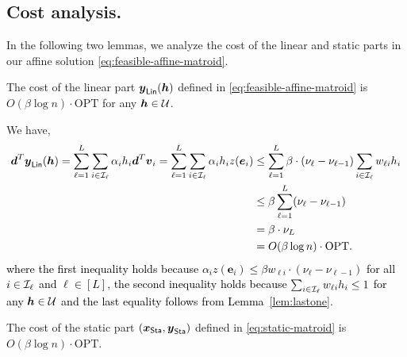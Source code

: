 \documentclass[moor]{informs1}              %
\newcommand{\opt}{\mathrm{OPT}}
\newcommand{\mb}[1]{\ensuremath{\boldsymbol{#1}}}
\newcommand*{\red}{\textcolor{black}}
\begin{document}
\subsection{Cost analysis.}
In the following two lemmas, we analyze the cost of the linear and static parts in our affine solution \eqref{eq:feasible-affine-matroid}.
\begin{lemma} \label{lem:cost-linear-matroid}
The cost of the linear part $\mb y_{\sf Lin}(\mb h)$ defined in \eqref{eq:feasible-affine-matroid} is $ O(\beta \log n)  \cdot \opt $ for any $\mb h \in {\cal U}$.
\end{lemma}
We have, 
\red{
\begin{align*}
\mb d ^T\mb y_{\sf Lin}( \mb h )   =  \sum_{\ell=1}^L \sum_{i \in  {\cal I}_{\ell}} \alpha_i h_i \mb d^T {\mb v}_i =   \sum_{\ell=1}^L \sum_{i \in  {\cal I}_{\ell}} \alpha_i h_i z( \mb e_i)
& \leq    \sum_{\ell=1}^L  \beta \cdot ( {\nu}_{\ell}-   {\nu}_{\ell-1})         \sum_{i \in  {\cal I}_{\ell}}   w_{\ell i}h_i \\
& \leq   \beta  \sum_{\ell=1}^L  ( {\nu}_{\ell}-   {\nu}_{\ell-1})       \\
& =  \beta \cdot {\nu}_L  \\
& =  O(\beta \log n)  \cdot \opt.
\end{align*}
where the first inequality holds because $\alpha_i z(\mb e_i)  \leq \beta w_{\ell i} \cdot( {\nu}_{\ell}-   {\nu}_{\ell-1})  $ for all $i \in {\cal I}_{\ell}$ and $\ell \in[L]$, the second inequality holds because $ \sum_{i \in {\cal I}_{\ell}}  w_{\ell i} h_i \leq 1$ for any $ \mb h \in {\cal U}$ and the last equality follows from Lemma~\ref{lem:lastone}.
\hfill
\Halmos
\endproof
}
\begin{lemma} \label{lem:cost-static-matroid}
The cost of the static part $(\mb x_{\sf Sta}, \mb y_{\sf Sta})$ defined  in \eqref{eq:static-matroid} is $O( \beta\log n) \cdot \opt$.
\end{lemma}
\end{document}

